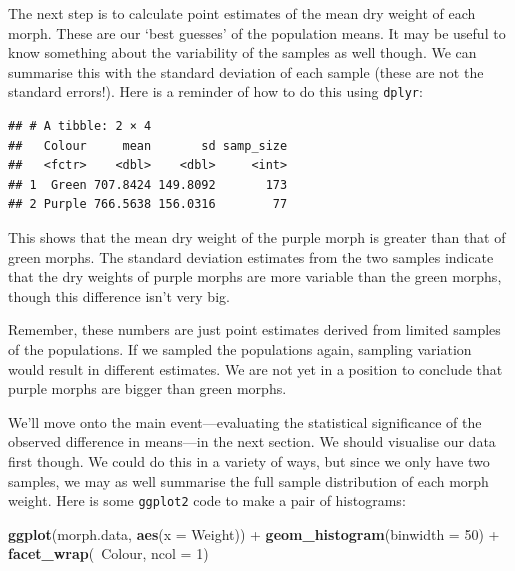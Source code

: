 \documentclass[]{book}
\newenvironment{Shaded}{\begin{snugshade}}{\end{snugshade}}
\newcommand{\KeywordTok}[1]{\textcolor[rgb]{0.13,0.29,0.53}{\textbf{{#1}}}}
\newcommand{\DataTypeTok}[1]{\textcolor[rgb]{0.13,0.29,0.53}{{#1}}}
\newcommand{\DecValTok}[1]{\textcolor[rgb]{0.00,0.00,0.81}{{#1}}}
\newcommand{\StringTok}[1]{\textcolor[rgb]{0.31,0.60,0.02}{{#1}}}
\newcommand{\NormalTok}[1]{{#1}}
\begin{document}
The next step is to calculate point estimates of the mean dry weight of
each morph. These are our `best guesses' of the population means. It may
be useful to know something about the variability of the samples as well
though. We can summarise this with the standard deviation of each sample
(these are not the standard errors!). Here is a reminder of how to do
this using \texttt{dplyr}:

\begin{Shaded}
\end{Shaded}

\begin{verbatim}
## # A tibble: 2 × 4
##   Colour     mean       sd samp_size
##   <fctr>    <dbl>    <dbl>     <int>
## 1  Green 707.8424 149.8092       173
## 2 Purple 766.5638 156.0316        77
\end{verbatim}

This shows that the mean dry weight of the purple morph is greater than
that of green morphs. The standard deviation estimates from the two
samples indicate that the dry weights of purple morphs are more variable
than the green morphs, though this difference isn't very big.

Remember, these numbers are just point estimates derived from limited
samples of the populations. If we sampled the populations again,
sampling variation would result in different estimates. We are not yet
in a position to conclude that purple morphs are bigger than green
morphs.

We'll move onto the main event---evaluating the statistical significance
of the observed difference in means---in the next section. We should
visualise our data first though. We could do this in a variety of ways,
but since we only have two samples, we may as well summarise the full
sample distribution of each morph weight. Here is some \texttt{ggplot2}
code to make a pair of histograms:

\begin{Shaded}
\begin{Highlighting}[]
\KeywordTok{ggplot}\NormalTok{(morph.data, }\KeywordTok{aes}\NormalTok{(}\DataTypeTok{x =} \NormalTok{Weight)) +}\StringTok{ }
\StringTok{  }\KeywordTok{geom_histogram}\NormalTok{(}\DataTypeTok{binwidth =} \DecValTok{50}\NormalTok{) +}\StringTok{ }
\StringTok{  }\KeywordTok{facet_wrap}\NormalTok{(~Colour, }\DataTypeTok{ncol =} \DecValTok{1}\NormalTok{)}
\end{Highlighting}
\end{Shaded}
\end{document}
